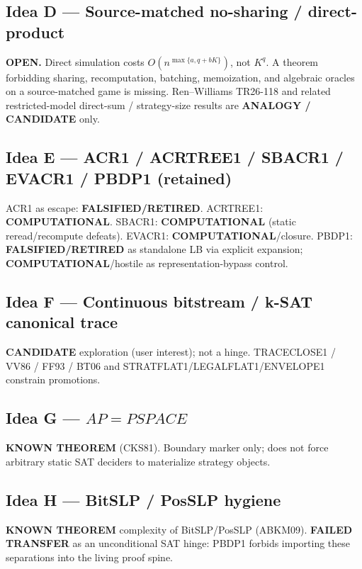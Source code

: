 \documentclass[11pt]{article}
\begin{document}
\subsection*{Idea D --- Source-matched no-sharing / direct-product}
\textbf{OPEN.} Direct simulation costs $O(n^{\max\{a,q+bK\}})$, not $K^q$.
A theorem forbidding sharing, recomputation, batching, memoization, and algebraic oracles
on a source-matched game is missing. Ren--Williams TR26-118 and related restricted-model
direct-sum / strategy-size results are \textbf{ANALOGY / CANDIDATE} only.

\subsection*{Idea E --- ACR1 / ACRTREE1 / SBACR1 / EVACR1 / PBDP1 (retained)}
ACR1 as escape: \textbf{FALSIFIED/RETIRED}.
ACRTREE1: \textbf{COMPUTATIONAL}.
SBACR1: \textbf{COMPUTATIONAL} (static reread/recompute defeats).
EVACR1: \textbf{COMPUTATIONAL}/closure.
PBDP1: \textbf{FALSIFIED/RETIRED} as standalone LB via explicit expansion;
\textbf{COMPUTATIONAL}/hostile as representation-bypass control.

\subsection*{Idea F --- Continuous bitstream / k-SAT canonical trace}
\textbf{CANDIDATE} exploration (user interest); not a hinge. TRACECLOSE1 / VV86 / FF93 / BT06
and STRATFLAT1/LEGALFLAT1/ENVELOPE1 constrain promotions.

\subsection*{Idea G --- $AP=PSPACE$}
\textbf{KNOWN THEOREM} (CKS81). Boundary marker only; does not force arbitrary static SAT
deciders to materialize strategy objects.

\subsection*{Idea H --- BitSLP / PosSLP hygiene}
\textbf{KNOWN THEOREM} complexity of BitSLP/PosSLP (ABKM09). \textbf{FAILED TRANSFER}
as an unconditional SAT hinge: PBDP1 forbids importing these separations into the living proof spine.
\end{document}
